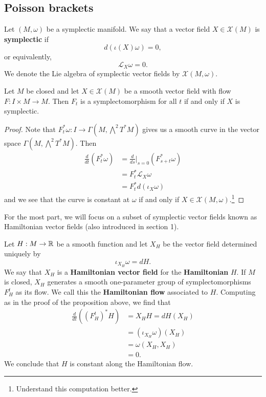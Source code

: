 \documentclass{amsart}
\begin{document}
\subsection{Poisson brackets}
\begin{definition}
    Let $(M,\omega)$ be a symplectic manifold. We say that a vector field $X\in\mathcal{X}(M)$
    is \textbf{symplectic} if
    \begin{equation*}
        d(\iota(X)\omega) = 0,
    \end{equation*}
    or equivalently,
    \begin{equation*}
        \mathcal{L}_X\omega=0.
    \end{equation*}
    We denote the Lie algebra of symplectic vector fields by $\mathcal{X}(M,\omega)$.
\end{definition}

\begin{proposition}
    Let $M$ be closed and let $X\in\mathcal{X}(M)$ be a smooth vector field with flow
    $F:I\times M\to M$. Then $F_t$ is a symplectomorphism for all $t$ if and only if
    $X$ is symplectic.
\end{proposition}
\begin{proof}
    Note that $F_t^*\omega:I\to \Gamma(M,\bigwedge^2T^*M)$ gives us a smooth curve in
    the vector space $\Gamma(M,\bigwedge^2T^*M)$. Then
    \begin{align*}
        \frac{d}{dt}\left( F_t^*\omega \right) &= \frac{d}{ds}\bigg|_{s=0}\left( F_{s+t}^*\omega\right)\\
        &=F_t^*\mathcal{L}_X\omega\\
        &= F_t^*d(\iota_{X}\omega)
    \end{align*}
    and we see that the curve is constant at $\omega$ if and only if $X\in\mathcal{X}(M,\omega)$.\footnote{Understand
    this computation better.}
\end{proof}

For the most part, we will focus on a subset of symplectic vector fields known as
Hamiltonian vector fields (also introduced in section 1).
\begin{definition}
    Let $H:M\to \mathbb{R}$ be a smooth function and let $X_H$ be the vector field determined
    uniquely by
    \begin{equation*}
        \iota_{X_H}\omega = dH.
    \end{equation*}
    We say that $X_H$ is a \textbf{Hamiltonian vector field} for the \textbf{Hamiltonian} $H$.
    If $M$ is closed, $X_H$ generates a smooth one-parameter group of symplectomorphisms
    $F_H^t$ as its flow. We call this the \textbf{Hamiltonian flow}
    associated to $H$. Computing as in the proof of the proposition above, we find that
    \begin{align*}
        \frac{d}{dt}\left( (F_H^t)^*H\right) &= X_HH = dH(X_H)\\
        &=(\iota_{X_H}\omega)(X_H)\\
        &=\omega(X_H,X_H)\\
        &=0.
    \end{align*}
    We conclude that $H$ is constant along the Hamiltonian flow.
\end{definition}
\end{document}
